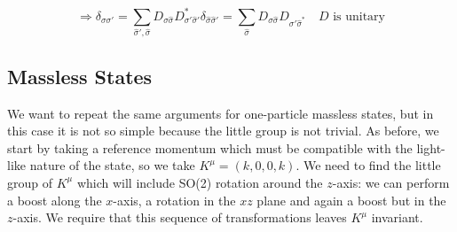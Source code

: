 \documentclass[../main.tex]{subfiles}
\begin{document}
\[
\Rightarrow \delta_{\sigma\sigma'}=\sum_{\hat{\sigma}',\hat{\sigma}}D_{\sigma\hat{\sigma}}D_{\sigma'\hat{\sigma}'}^*\delta_{\hat{\sigma}\hat{\sigma}'}=\sum_{\hat{\sigma}}D_{\sigma\hat{\sigma}}D_{\sigma'\hat{\sigma}^*} \quad \text{$D$ is unitary}
\]
\subsection{Massless States}
We want to repeat the same arguments for one-particle massless states, but in this case it is not so simple because the little group is not trivial. As before, we start by taking a reference momentum which must be compatible with the light-like nature of the state, so we take $K^\mu=(k,0,0,k)$. We need to find the little group of $K^\mu$ which will include SO(2) rotation around the $z$-axis: we can perform a boost along the $x$-axis, a rotation in the $xz$ plane and again a boost but in the $z$-axis. We require that this sequence of transformations leaves $K^\mu$ invariant.
\end{document}
